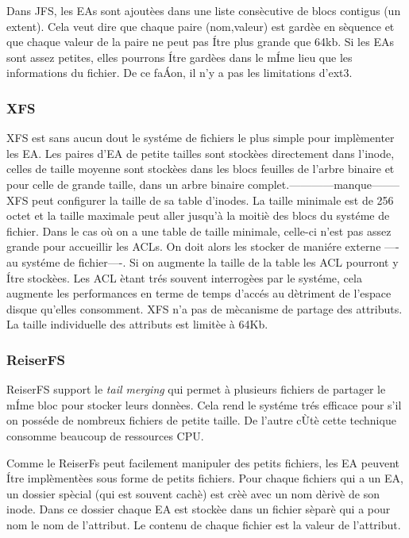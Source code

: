 Dans JFS, les EAs sont ajoutèes dans une liste consècutive de blocs contigus (un extent).  Cela veut dire que chaque paire (nom,valeur) est gardèe en sèquence et que chaque valeur de la paire ne peut pas Ítre plus grande que 64kb. Si les EAs sont assez petites, elles pourrons Ítre gardèes dans le mÍme lieu que les informations du fichier. De ce faÁon, il n'y a pas les limitations d'ext3.
 
\subsubsection*{XFS}
XFS est sans aucun dout le systéme de fichiers le plus simple pour implèmenter les EA. Les paires d'EA de petite tailles sont stockèes directement dans l'inode, celles de taille moyenne sont stockèes dans les blocs feuilles de l'arbre binaire et pour celle de grande taille, dans un arbre binaire complet.------------manque--------
XFS peut configurer la taille de sa table d'inodes. La taille minimale est de 256 octet et la taille maximale peut aller jusqu'à la moitiè des blocs du systéme de fichier. Dans le cas où on a une table de taille minimale, celle-ci n'est pas assez grande pour accueillir les ACLs. On doit alors les stocker de maniére externe ----au systéme de fichier----. Si on augmente la taille de la table les ACL pourront y Ítre stockèes. Les ACL ètant trés souvent interrogèes par le systéme, cela augmente les performances en terme de temps d'accés au dètriment de l'espace disque qu'elles consomment.
XFS n'a pas de mècanisme de partage des attributs. La taille individuelle des attributs est limitèe à 64Kb.
 
\subsubsection*{ReiserFS}


ReiserFS support le \emph{tail merging} qui permet à plusieurs fichiers de partager le mÍme bloc pour stocker leurs donnèes. Cela rend le systéme trés efficace pour s'il on posséde de nombreux fichiers de petite taille. De l'autre cÙtè cette technique consomme beaucoup de ressources CPU. 

Comme le ReiserFs peut facilement manipuler des petits fichiers, les EA peuvent Ítre implèmentèes sous forme de petits fichiers. Pour chaque fichiers qui a un EA, un dossier spècial (qui est souvent cachè) est crèè avec un nom dèrivè de son inode. Dans ce dossier chaque EA est stockèe dans un fichier sèparè qui a pour nom le nom de l'attribut. Le contenu de chaque fichier est la valeur de l'attribut.


